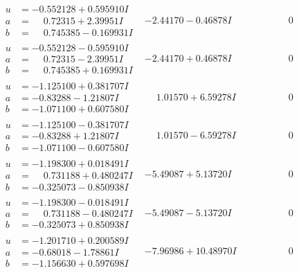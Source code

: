 \documentclass[1p]{elsarticle_modified}
\theoremstyle{definition}
\begin{document}
$$\begin{array}{c|c|c}
\begin{aligned}
u &= -0.552128 + 0.595910 I \\
a &= \phantom{-}0.72315 + 2.39951 I \\
b &= \phantom{-}0.745385 - 0.169931 I\end{aligned}
 & -2.44170 - 0.46878 I & \phantom{-0.000000 } 0 \\ \hline\begin{aligned}
u &= -0.552128 - 0.595910 I \\
a &= \phantom{-}0.72315 - 2.39951 I \\
b &= \phantom{-}0.745385 + 0.169931 I\end{aligned}
 & -2.44170 + 0.46878 I & \phantom{-0.000000 } 0 \\ \hline\begin{aligned}
u &= -1.125100 + 0.381707 I \\
a &= -0.83288 - 1.21807 I \\
b &= -1.071100 + 0.607580 I\end{aligned}
 & \phantom{-}1.01570 + 6.59278 I & \phantom{-0.000000 } 0 \\ \hline\begin{aligned}
u &= -1.125100 - 0.381707 I \\
a &= -0.83288 + 1.21807 I \\
b &= -1.071100 - 0.607580 I\end{aligned}
 & \phantom{-}1.01570 - 6.59278 I & \phantom{-0.000000 } 0 \\ \hline\begin{aligned}
u &= -1.198300 + 0.018491 I \\
a &= \phantom{-}0.731188 + 0.480247 I \\
b &= -0.325073 - 0.850938 I\end{aligned}
 & -5.49087 + 5.13720 I & \phantom{-0.000000 } 0 \\ \hline\begin{aligned}
u &= -1.198300 - 0.018491 I \\
a &= \phantom{-}0.731188 - 0.480247 I \\
b &= -0.325073 + 0.850938 I\end{aligned}
 & -5.49087 - 5.13720 I & \phantom{-0.000000 } 0 \\ \hline\begin{aligned}
u &= -1.201710 + 0.200589 I \\
a &= -0.68018 - 1.78861 I \\
b &= -1.156630 + 0.597698 I\end{aligned}
 & -7.96986 + 10.48970 I & \phantom{-0.000000 } 0 \\ \hline\begin{aligned}

\end{aligned}
\end{array}$$
\end{document}
